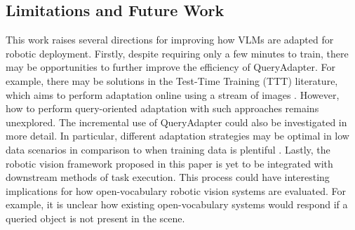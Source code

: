 \subsection{Limitations and Future Work}
This work raises several directions for improving how VLMs are adapted for robotic deployment. Firstly, despite requiring only a few minutes to train, there may be opportunities to further improve the efficiency of QueryAdapter. For example, there may be solutions in the Test-Time Training (TTT) literature, which aims to perform adaptation online using a stream of images \cite{improved_tta}. However, how to perform query-oriented adaptation with such approaches remains unexplored. The incremental use of QueryAdapter could also be investigated in more detail. In particular, different adaptation strategies may be optimal in low data scenarios \cite{coop, cocoop} in comparison to when training data is plentiful \cite{udaod2}. Lastly, the robotic vision framework proposed in this paper is yet to be integrated with downstream methods of task execution. This process could have interesting implications for how open-vocabulary robotic vision systems are evaluated. For example, it is unclear how existing open-vocabulary systems would respond if a queried object is not present in the scene. 
